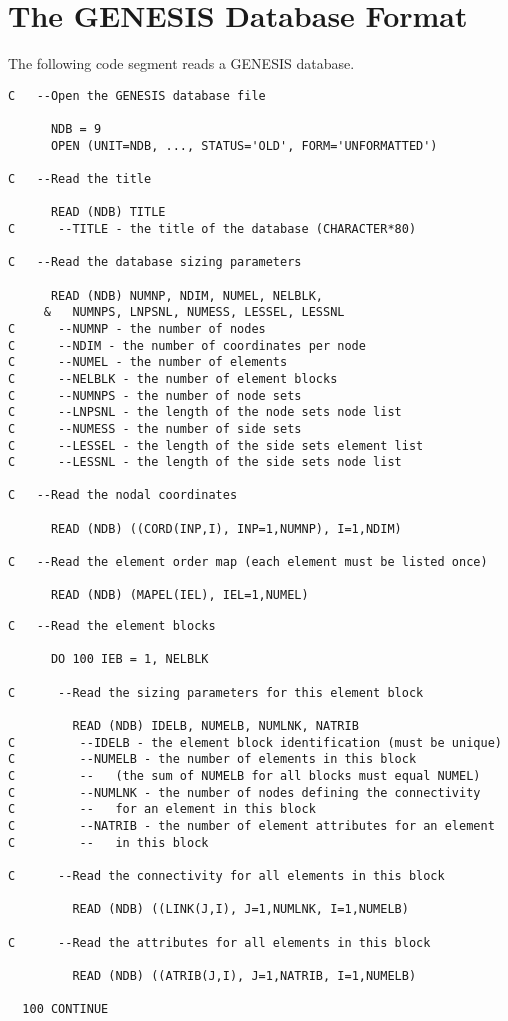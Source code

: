 \chapter{The GENESIS Database Format} \label{appx:genesis}

The following code segment reads a GENESIS database.

\begin{verbatim}
C   --Open the GENESIS database file

      NDB = 9
      OPEN (UNIT=NDB, ..., STATUS='OLD', FORM='UNFORMATTED')

C   --Read the title

      READ (NDB) TITLE
C      --TITLE - the title of the database (CHARACTER*80)

C   --Read the database sizing parameters

      READ (NDB) NUMNP, NDIM, NUMEL, NELBLK,
     &   NUMNPS, LNPSNL, NUMESS, LESSEL, LESSNL
C      --NUMNP - the number of nodes
C      --NDIM - the number of coordinates per node
C      --NUMEL - the number of elements
C      --NELBLK - the number of element blocks
C      --NUMNPS - the number of node sets
C      --LNPSNL - the length of the node sets node list
C      --NUMESS - the number of side sets
C      --LESSEL - the length of the side sets element list
C      --LESSNL - the length of the side sets node list

C   --Read the nodal coordinates

      READ (NDB) ((CORD(INP,I), INP=1,NUMNP), I=1,NDIM)

C   --Read the element order map (each element must be listed once)

      READ (NDB) (MAPEL(IEL), IEL=1,NUMEL)
\end{verbatim}
\newpage
\begin{verbatim}
C   --Read the element blocks

      DO 100 IEB = 1, NELBLK

C      --Read the sizing parameters for this element block

         READ (NDB) IDELB, NUMELB, NUMLNK, NATRIB
C         --IDELB - the element block identification (must be unique)
C         --NUMELB - the number of elements in this block
C         --   (the sum of NUMELB for all blocks must equal NUMEL)
C         --NUMLNK - the number of nodes defining the connectivity
C         --   for an element in this block
C         --NATRIB - the number of element attributes for an element
C         --   in this block

C      --Read the connectivity for all elements in this block

         READ (NDB) ((LINK(J,I), J=1,NUMLNK, I=1,NUMELB)

C      --Read the attributes for all elements in this block

         READ (NDB) ((ATRIB(J,I), J=1,NATRIB, I=1,NUMELB)

  100 CONTINUE
\end{verbatim}
